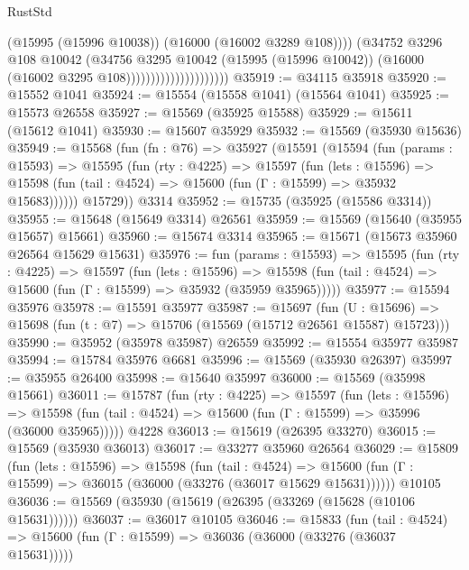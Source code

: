 \begin{lexlean}{RustStd}
\begin{coremodule}
                                          (@15995 (@15996 @10038))
                                          (@16000 (@16002 @3289 @108))))
                                      (@34752
                                        @3296
                                        @108
                                        @10042
                                        (@34756
                                          @3295
                                          @10042
                                          (@15995 (@15996 @10042))
                                          (@16000 (@16002 @3295 @108)))))))))))))))))))))
@35919 := @34115 @35918
@35920 := @15552 @1041
@35924 := @15554 (@15558 @1041) (@15564 @1041)
@35925 := @15573 @26558
@35927 := @15569 (@35925 @15588)
@35929 := @15611 (@15612 @1041)
@35930 := @15607 @35929
@35932 := @15569 (@35930 @15636)
@35949 := @15568
    (fun (fn : @76) =>
    @35927
      (@15591
        (@15594
          (fun (params : @15593) =>
          @15595
            (fun (rty : @4225) =>
            @15597
              (fun (lets : @15596) =>
              @15598 (fun (tail : @4524) => @15600 (fun (Γ : @15599) => @35932 @15683))))))
        @15729))
    @3314
@35952 := @15735 (@35925 (@15586 @3314))
@35955 := @15648 (@15649 @3314) @26561
@35959 := @15569 (@15640 (@35955 @15657) @15661)
@35960 := @15674 @3314
@35965 := @15671 (@15673 @35960 @26564 @15629 @15631)
@35976 := fun (params : @15593) =>
  @15595
    (fun (rty : @4225) =>
    @15597
      (fun (lets : @15596) =>
      @15598 (fun (tail : @4524) => @15600 (fun (Γ : @15599) => @35932 (@35959 @35965)))))
@35977 := @15594 @35976
@35978 := @15591 @35977
@35987 := @15697
    (fun (U : @15696) => @15698 (fun (t : @7) => @15706 (@15569 (@15712 @26561 @15587) @15723)))
@35990 := @35952 (@35978 @35987) @26559
@35992 := @15554 @35977 @35987
@35994 := @15784 @35976 @6681
@35996 := @15569 (@35930 @26397)
@35997 := @35955 @26400
@35998 := @15640 @35997
@36000 := @15569 (@35998 @15661)
@36011 := @15787
    (fun (rty : @4225) =>
    @15597
      (fun (lets : @15596) =>
      @15598 (fun (tail : @4524) => @15600 (fun (Γ : @15599) => @35996 (@36000 @35965)))))
    @4228
@36013 := @15619 (@26395 @33270)
@36015 := @15569 (@35930 @36013)
@36017 := @33277 @35960 @26564
@36029 := @15809
    (fun (lets : @15596) =>
    @15598
      (fun (tail : @4524) =>
      @15600 (fun (Γ : @15599) => @36015 (@36000 (@33276 (@36017 @15629 @15631))))))
    @10105
@36036 := @15569 (@35930 (@15619 (@26395 (@33269 (@15628 (@10106 @15631))))))
@36037 := @36017 @10105
@36046 := @15833
    (fun (tail : @4524) => @15600 (fun (Γ : @15599) => @36036 (@36000 (@33276 (@36037 @15631)))))

\end{coremodule}
\end{lexlean}

